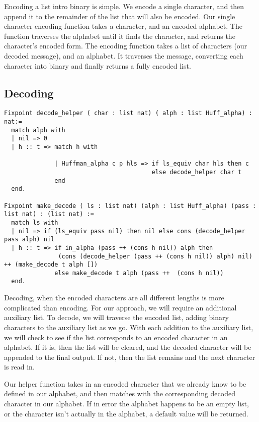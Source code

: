 \documentclass{llncs}
\begin{document}
Encoding a list intro binary is simple. We encode a single character, and then append it to the remainder of the list that will also be encoded. Our single character encoding function takes a character, and an encoded alphabet. The function traverses  the alphabet until it finds the character, and returns the character’s encoded form. The encoding function takes a list of characters (our decoded message), and an alphabet. It traverses the message, converting each character into binary and finally returns a fully encoded list.   

\subsection{Decoding}

\begin{lstlisting}
Fixpoint decode_helper ( char : list nat) ( alph : list Huff_alpha) :  nat:=
  match alph with
  | nil => 0
  | h :: t => match h with
             
              | Huffman_alpha c p hls => if ls_equiv char hls then c
                                         else decode_helper char t
              end
  end.

Fixpoint make_decode ( ls : list nat) (alph : list Huff_alpha) (pass : list nat) : (list nat) :=
  match ls with 
  | nil => if (ls_equiv pass nil) then nil else cons (decode_helper pass alph) nil
  | h :: t => if in_alpha (pass ++ (cons h nil)) alph then
               (cons (decode_helper (pass ++ (cons h nil)) alph) nil) ++ (make_decode t alph [])
              else make_decode t alph (pass ++  (cons h nil))
  end.

\end{lstlisting}

Decoding, when the encoded characters are all different lengths is more complicated than encoding. For our approach, we will require an additional auxiliary list. To decode, we will traverse the encoded list, adding binary characters to the auxiliary list as we go. With each addition to the auxiliary list, we will check to see if the list corresponds to an encoded character in an alphabet. If it is, then the list will be cleared, and the decoded character will be appended to the final output. If not, then the list remains and the next character is read in. 

Our helper function takes in an encoded character that we already know to be defined in our alphabet, and then matches with the corresponding decoded character in our alphabet. If in error the alphabet happens to be an empty list, or the character isn’t actually in the alphabet, a default value will be returned. 
\end{document}
